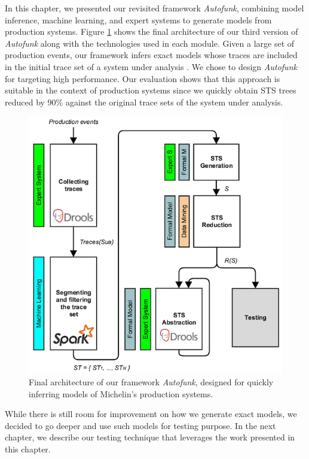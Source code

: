 In this chapter, we presented our revisited framework
\textit{Autofunk}, combining model inference, machine learning,
and expert systems to generate models from production systems.
Figure \ref{fig:autofunk_branded} shows the final architecture of
our third version of \textit{Autofunk} along with the
technologies used in each module. Given a large set of production
events, our framework infers exact models whose traces are
included in the initial trace set of a system under analysis
\cite{petrenko06}.  We chose to design \textit{Autofunk} for
targeting high performance. Our evaluation shows that this
approach is suitable in the context of production systems since
we quickly obtain STS trees reduced by 90\% against the original
trace sets of the system under analysis.

\begin{figure}[h]
    \begin{center}
        \includegraphics[width=1.0\linewidth]{figures/autofunk_branded.png}
    \end{center}

    \caption{Final architecture of our framework \textit{Autofunk},
    designed for quickly inferring models of Michelin's production systems.}
    \label{fig:autofunk_branded}
\end{figure}

While there is still room for improvement on how we generate
exact models, we decided to go deeper and use such models for
testing purpose. In the next chapter, we describe our testing
technique that leverages the work presented in this chapter.
